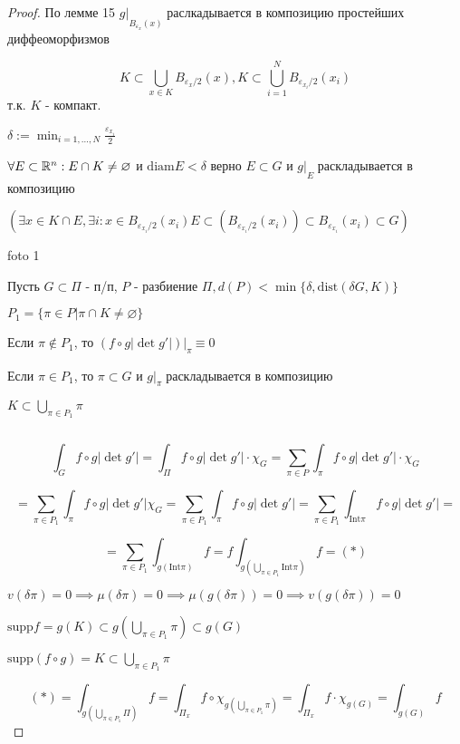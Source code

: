 \begin{proof}
        По лемме 15 $g|\underset{B_{\varepsilon_x}(x) }{}$ раслкадывается в композицию простейших диффеоморфизмов
        
        $$K \subset \bigcup_{x\in K} {B_{\varepsilon_x/2}(x) }, 
        K \subset \bigcup^N_{i=1} {B_{\varepsilon_{x_i}/2}(x_i) }$$
        т.к. $K$ - компакт.

        $\displaystyle\delta := \min_{i=1,\dotsc,N} \frac{\varepsilon_{x_i}}{2}$

        $\forall E \subset \mathbb{R}^n: E \cap K \neq \varnothing $ и $\text{diam}E < \delta$ 
        верно $E \subset G$ и $g | \underset{E}{ }$ раскладывается в композицию
    
        $\left(\exists x \in K \cap E, \exists i: x \in B_{\varepsilon_{x_i}/2}(x_i)
        E \subset (B_{\varepsilon_{x_i}/2}(x_i)) \subset B_{\varepsilon_{x_i}}(x_i) \subset G
        \right)$

        foto 1

        Пусть $G \subset \Pi$ - п/п, $P$ - разбиение $\Pi, d(P) < \min \{
            \delta, \text{dist}(\delta G, K)\}$
            
        $P_1 = \{ \pi \in P | \pi \cap K \neq \varnothing\}$

        Если $\pi \notin P_1$, то $(f \circ g |\det g'|) | \underset{\pi}{ } \equiv 0$

        Если $\pi \in P_1$, то $\pi \subset G$ и $g|\underset{\pi}{ }$ раскладывается в композицию

        $K \subset \bigcup_{\pi \in P_1} \pi$

        \par $ $

        $$\int_{G} f\circ g |\det g'| = \int_\Pi f\circ g |\det g'| \cdot \chi_G = 
        \sum_{\pi \in P} \int_\pi f\circ g |\det g'| \cdot \chi_G$$

        $$=\sum_{\pi \in P_1} \int_\pi f \circ g |\det g'| \chi_G =  
        \sum_{\pi \in P_1} \int_\pi f\circ g |\det g'| = 
        \sum_{\pi \in P_1}\int_{\text{Int}\pi} f\circ g | \det g'| =$$

        $$
        = \sum_{\pi \in P_1} \int_{g(\text{Int}\pi)} f =
        f\int_{g(\bigcup_{\pi\in P_1}\text{Int}\pi)}f = (*)$$

        $v(\delta\pi) = 0\implies \mu(\delta\pi) = 0 \implies \mu(g(\delta\pi)) = 0 \implies v(g(\delta\pi))=0$

        $\text{supp}f = g(K) \subset g(\bigcup_{\pi\in P_1}\pi) \subset g(G)$

        $\text{supp}(f\circ g) = K \subset \bigcup_{\pi\in P_1}\pi$

        $$(*) = \int_{g(\bigcup_{\pi\in P_1}\Pi)}f = \int_{\Pi_x}f\circ \chi_{g(\bigcup_{\pi \in P_1}\pi)} = 
        \int_{\Pi_x}f\cdot \chi_{g(G)} = \int_{g(G)}f$$
        
    \end{proof}

